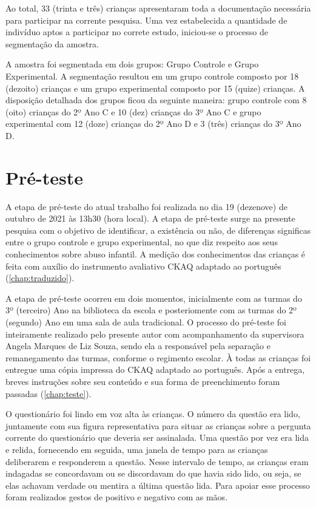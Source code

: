 Ao total, 33 (trinta e três) crianças apresentaram toda a documentação necessária para participar na corrente pesquisa. Uma vez estabelecida a quantidade de indivíduo aptos a participar no correte estudo, iniciou-se o processo de segmentação da amostra. 

A amostra foi segmentada em dois grupos: Grupo Controle e Grupo Experimental. A segmentação resultou em um grupo controle composto por 18 (dezoito) crianças e um grupo experimental composto por 15 (quize) crianças. A disposição detalhada dos grupos ficou da seguinte maneira: grupo controle com 8 (oito) crianças do 2º Ano C e 10 (dez) crianças do 3º Ano C e grupo experimental com 12 (doze) crianças do 2º Ano D e 3 (três) crianças do 3º Ano D.


\section{Pré-teste}\label{sec:pretes}

A etapa de pré-teste do atual trabalho foi realizada no dia 19 (dezenove) de outubro de 2021 às 13h30 (hora local). A etapa de pré-teste surge na presente pesquisa com o objetivo de identificar, a existência ou não, de diferenças significas entre o grupo controle e grupo experimental, no que diz respeito aos seus conhecimentos sobre abuso infantil. A medição dos conhecimentos das crianças é feita com auxílio do instrumento avaliativo \acf{CKAQ} adaptado ao português (\autoref{chap:traduzido}). 

A etapa de pré-teste ocorreu em dois momentos, inicialmente com as turmas do 3º (terceiro) Ano na biblioteca da escola e posteriomente com as turmas do 2º (segundo) Ano em uma sala de aula tradicional. O processo do pré-teste foi inteiramente realizado pelo presente autor com acompanhamento da supervisora Angela Marques de Liz Souza, sendo ela a responsável pela separação e remanegamento das turmas, conforme o regimento escolar. À todas as crianças foi entregue uma cópia impressa do \ac{CKAQ} adaptado ao português. Após a entrega, breves instruções sobre seu conteúdo e sua forma de preenchimento foram passadas (\autoref{chap:teste}). %

O questionário foi lindo em voz alta às crianças. O número da questão era lido, juntamente com sua figura representativa para situar as crianças sobre a pergunta corrente do questionário que deveria ser assinalada. Uma questão por vez era lida e relida, fornecendo em seguida, uma janela de tempo para as crianças deliberarem e responderem a questão. Nesse intervalo de tempo, as crianças eram indagadas se concordavam ou se discordavam do que havia sido lido, ou seja, se elas achavam verdade ou mentira a última questão lida. Para apoiar esse processo foram realizados gestos de positivo e negativo com as mãos.

